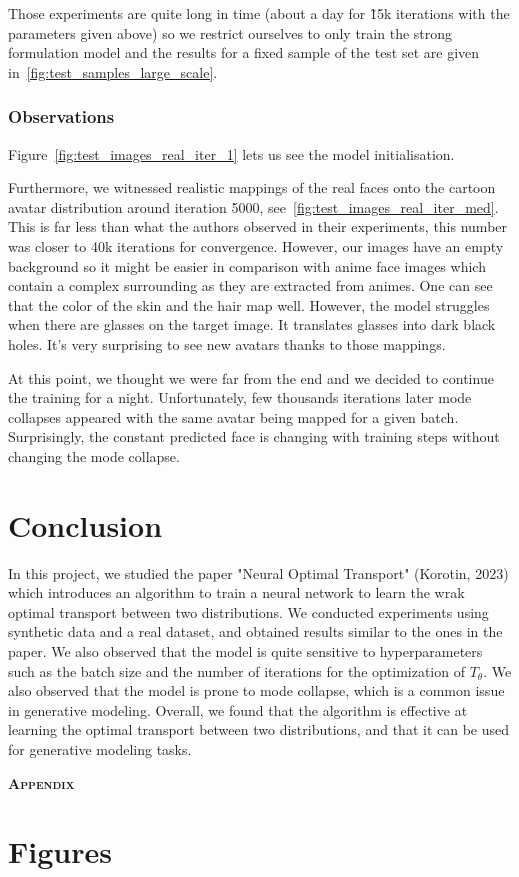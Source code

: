 \documentclass[11pt]{article}
\begin{document}
Those experiments are quite long in time (about a day for \~15k iterations with the parameters given above) so we restrict ourselves to only train the strong formulation model and the results for a fixed sample of the test set are given in~\ref{fig:test_samples_large_scale}.

\subsubsection{Observations}

Figure~\ref{fig:test_images_real_iter_1} lets us see the model initialisation.

Furthermore, we witnessed realistic mappings of the real faces onto the cartoon avatar distribution around iteration 5000, see~\ref{fig:test_images_real_iter_med}. This is far less than what the authors observed in their experiments, this number was closer to 40k iterations for convergence. However, our images have an empty background so it might be easier in comparison with anime face images which contain a complex surrounding as they are extracted from animes. One can see that the color of the skin and the hair map well. However, the model struggles when there are glasses on the target image. It translates glasses into dark black holes. It's very surprising to see new avatars thanks to those mappings.

At this point, we thought we were far from the end and we decided to continue the training for a night. Unfortunately, few thousands iterations later mode collapses appeared with the same avatar being mapped for a given batch. Surprisingly, the constant predicted face is changing with training steps without changing the mode collapse.

\section{Conclusion}

In this project, we studied the paper "Neural Optimal Transport" (Korotin, 2023) \cite{korotin-2022} which introduces an algorithm to train a neural network to learn the wrak optimal transport between two distributions. We conducted experiments using synthetic data and a real dataset, and obtained results similar to the ones in the paper. We also observed that the model is quite sensitive to hyperparameters such as the batch size and the number of iterations for the optimization of $T_\theta$. We also observed that the model is prone to mode collapse, which is a common issue in generative modeling. Overall, we found that the algorithm is effective at learning the optimal transport between two distributions, and that it can be used for generative modeling tasks.

\newpage


\newpage
\appendix

\begin{center}
    {\Large \bfseries \scshape Appendix} \\
\end{center}

\section{Figures}
\end{document}
